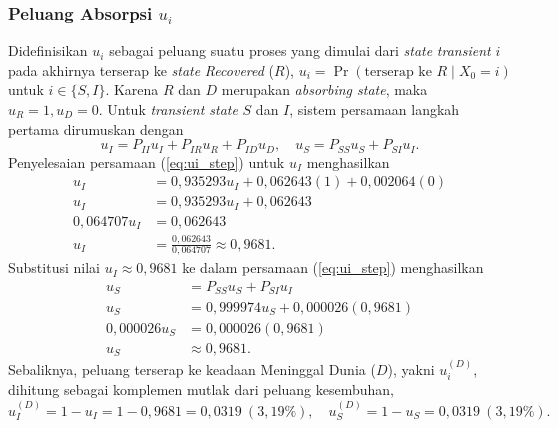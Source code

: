 \documentclass[12pt,a4paper]{article}
\numberwithin{equation}{section}
\begin{document}
\subsubsection{Peluang Absorpsi \texorpdfstring{$u_i$}{u\_i}}
Didefinisikan $u_i$ sebagai peluang suatu proses yang dimulai dari \textit{state} \textit{transient} $i$ pada akhirnya terserap ke \textit{state} \textit{Recovered} ($R$), $u_i = \Pr(\text{terserap ke } R \mid X_0 = i)$ untuk $i \in \{S, I\}$. Karena $R$ dan $D$ merupakan \textit{absorbing state}, maka $u_R = 1, u_D = 0$. Untuk \textit{transient state} $S$ dan $I$, sistem persamaan langkah pertama dirumuskan dengan
\begin{equation}
  u_I = P_{II}u_I + P_{IR}u_R + P_{ID}u_D, \quad u_S = P_{SS}u_S + P_{SI}u_I.
  \label{eq:ui_step}
\end{equation}
Penyelesaian persamaan (\ref{eq:ui_step}) untuk $u_I$ menghasilkan
\begin{align*}
  u_I &= 0{,}935293u_I + 0{,}062643(1) + 0{,}002064(0) \\
  u_I &= 0{,}935293u_I + 0{,}062643 \\
  0{,}064707u_I &= 0{,}062643 \\
  u_I &= \frac{0{,}062643}{0{,}064707} \approx 0{,}9681.
\end{align*}
Substitusi nilai $u_I \approx 0{,}9681$ ke dalam persamaan (\ref{eq:ui_step}) menghasilkan
\begin{align*}
  u_S &= P_{SS}u_S + P_{SI}u_I \\
  u_S &= 0{,}999974u_S + 0{,}000026(0{,}9681) \\
  0{,}000026u_S &= 0{,}000026(0{,}9681) \\
  u_S &\approx 0{,}9681.
\end{align*}
Sebaliknya, peluang terserap ke keadaan Meninggal Dunia ($D$), yakni $u_i^{(D)}$, dihitung sebagai komplemen mutlak dari peluang kesembuhan,
\begin{equation*}
  u_I^{(D)} = 1 - u_I = 1 - 0{,}9681 = 0{,}0319 \ (3{,}19\%), \quad u_S^{(D)} = 1 - u_S = 0{,}0319 \ (3{,}19\%).
\end{equation*}
\end{document}

